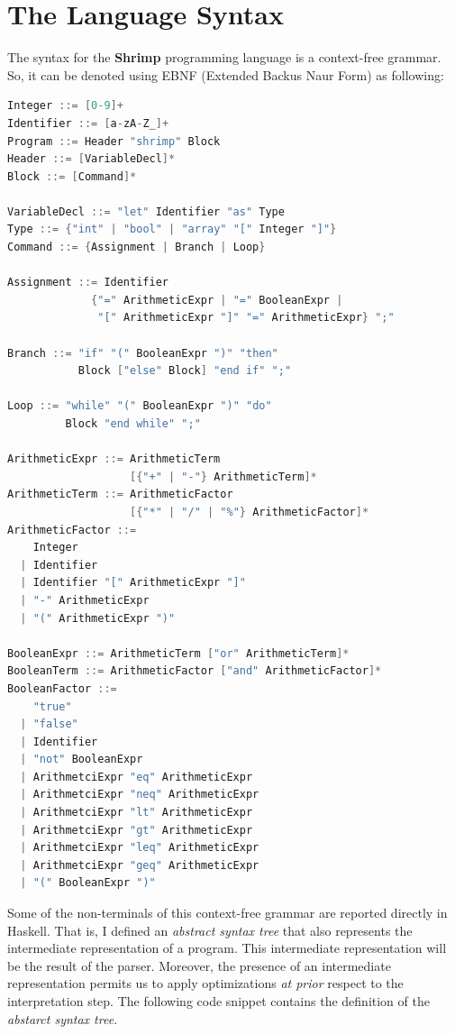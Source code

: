 \documentclass[12pt,a4paper]{article}
\begin{document}
\section*{The Language Syntax}
The syntax for the \textbf{Shrimp} programming language is a context-free grammar.
So, it can be denoted using EBNF (Extended Backus Naur Form) as following:
\begin{lstlisting}[language=C, style=custom-style]
Integer ::= [0-9]+
Identifier ::= [a-zA-Z_]+
Program ::= Header "shrimp" Block
Header ::= [VariableDecl]*
Block ::= [Command]*

VariableDecl ::= "let" Identifier "as" Type
Type ::= {"int" | "bool" | "array" "[" Integer "]"}
Command ::= {Assignment | Branch | Loop}

Assignment ::= Identifier
             {"=" ArithmeticExpr | "=" BooleanExpr |
              "[" ArithmeticExpr "]" "=" ArithmeticExpr} ";"

Branch ::= "if" "(" BooleanExpr ")" "then"
           Block ["else" Block] "end if" ";"

Loop ::= "while" "(" BooleanExpr ")" "do"
         Block "end while" ";"

ArithmeticExpr ::= ArithmeticTerm
                   [{"+" | "-"} ArithmeticTerm]*
ArithmeticTerm ::= ArithmeticFactor
                   [{"*" | "/" | "%"} ArithmeticFactor]*
ArithmeticFactor ::=
    Integer
  | Identifier
  | Identifier "[" ArithmeticExpr "]"
  | "-" ArithmeticExpr
  | "(" ArithmeticExpr ")"

BooleanExpr ::= ArithmeticTerm ["or" ArithmeticTerm]*
BooleanTerm ::= ArithmeticFactor ["and" ArithmeticFactor]*
BooleanFactor ::=
    "true"
  | "false"
  | Identifier
  | "not" BooleanExpr
  | ArithmetciExpr "eq" ArithmeticExpr
  | ArithmetciExpr "neq" ArithmeticExpr
  | ArithmetciExpr "lt" ArithmeticExpr
  | ArithmetciExpr "gt" ArithmeticExpr
  | ArithmetciExpr "leq" ArithmeticExpr
  | ArithmetciExpr "geq" ArithmeticExpr
  | "(" BooleanExpr ")"
\end{lstlisting}
Some of the non-terminals of this context-free grammar are reported directly in Haskell.
That is, I defined an \textit{abstract syntax tree} that also represents the intermediate representation of a program.
This intermediate representation will be the result of the parser.
Moreover, the presence of an intermediate representation permits us to apply optimizations \textit{at prior} respect to the interpretation step.
The following code snippet contains the definition of the \textit{abstarct syntax tree}.
\end{document}
